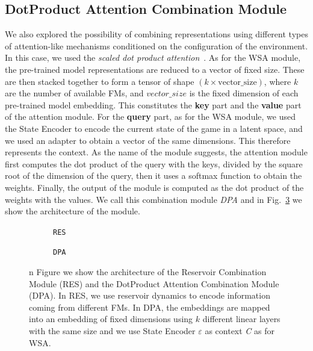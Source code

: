 \subsection{DotProduct Attention Combination Module}
\label{subsec:dpa}

We also explored the possibility of combining representations using different types of attention-like mechanisms conditioned on the configuration of the environment.
In this case, we used the \textit{scaled dot product attention}~\citep{vaswani2017attention}.
As for the WSA module, the pre-trained model representations are reduced to a vector of fixed size.
These are then stacked together to form a tensor of shape $(k \times \text{vector\_size})$, where $k$ are the number of available FMs, and $vector\_size$ is the fixed dimension of each pre-trained model embedding.
This constitutes the \textbf{key} part and the \textbf{value} part of the attention module.
For the \textbf{query} part, as for the WSA module, we used the State Encoder to encode the current state of the game in a latent space, and we used an adapter to obtain a vector of the same dimensions.
This therefore represents the context.
As the name of the module suggests, the attention module first computes the dot product of the query with the keys, divided by the square root of the dimension of the query, then it uses a softmax function to obtain the weights.
Finally, the output of the module is computed as the dot product of the weights with the values.
We call this combination module \textit{DPA} and in Fig.~\ref{fig:dpa_combination} we show the architecture of the module.


\begin{figure}[ht]
    \centering
    \begin{subfigure}[b]{0.47\textwidth}
        \centering
        \fbox{\rule[-.5cm]{0cm}{4cm} \rule[-.5cm]{4cm}{0cm}}
        \caption{\texttt{RES}}
        \label{fig:reservoir_combination}
    \end{subfigure}
    \hfill
    \begin{subfigure}[b]{0.47\textwidth}
        \centering
        \fbox{\rule[-.5cm]{0cm}{4cm} \rule[-.5cm]{4cm}{0cm}}
        \caption{\texttt{DPA}}
        \label{fig:dpa}
    \end{subfigure}

    \caption{n Figure we show the architecture of the Reservoir Combination Module (RES) and the DotProduct Attention Combination Module (DPA). In RES, we use reservoir dynamics to encode information coming from different FMs. In DPA, the embeddings are mapped into an embedding of fixed dimensions using $k$ different linear layers with the same size and we use State Encoder $\varepsilon$ as context \textit{C} as for WSA.}
    \label{fig:dpa_combination}
\end{figure}

